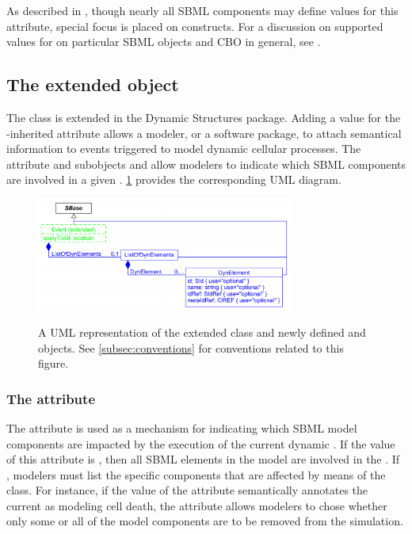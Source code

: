 As described in , though nearly all SBML components may define values for this attribute, special focus is placed on \Event constructs. For a discussion on supported values for  on particular SBML objects and CBO in general, see .


\subsection{The extended  object}
\label{subsec:extEvent}

The \Event class is extended in the Dynamic Structures package. Adding a value for the \SBase-inherited  attribute allows a modeler, or a software package, to attach semantical information to events triggered to model dynamic cellular processes. The  attribute and subobjects \ListOfDynElements and \DynElement allow modelers to indicate which SBML components are involved in a given \Event. \ref{fig:UMLExtendedEvent} provides the corresponding UML diagram. 

\begin{figure}[tbhp]
  \centering
  \includegraphics[width=0.75\textwidth]{images/UMLExtendedEvent.pdf}\\
  \caption{A UML representation of the extended \Event class and newly defined \ListOfDynElements and \DynElement objects. See \ref{subsec:conventions} for conventions related to this figure.} \label{fig:UMLExtendedEvent}
\end{figure}

\subsubsection{The  attribute}
\label{attr:applyToAll}
The  attribute is used as a mechanism for indicating which SBML model components are impacted by the execution of the current dynamic \Event. If the value of this attribute is , then all SBML elements in the model are involved in the \Event. If , modelers must list the specific components that are affected by means of the \ListOfDynElements class. For instance, if the value of the  attribute semantically annotates the current \Event as modeling cell death, the  attribute allows modelers to chose whether only some or all of the model components are to be removed from the simulation. 

